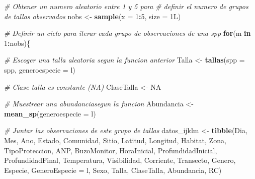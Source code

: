 \documentclass[]{krantz}
\makeatletter
\newenvironment{Shaded}{\begin{snugshade}}{\end{snugshade}}
\newcommand{\CommentTok}[1]{\textcolor[rgb]{0.56,0.35,0.01}{\textit{#1}}}
\newcommand{\ControlFlowTok}[1]{\textcolor[rgb]{0.13,0.29,0.53}{\textbf{#1}}}
\newcommand{\DataTypeTok}[1]{\textcolor[rgb]{0.13,0.29,0.53}{#1}}
\newcommand{\DecValTok}[1]{\textcolor[rgb]{0.00,0.00,0.81}{#1}}
\newcommand{\KeywordTok}[1]{\textcolor[rgb]{0.13,0.29,0.53}{\textbf{#1}}}
\newcommand{\NormalTok}[1]{#1}
\newcommand{\OperatorTok}[1]{\textcolor[rgb]{0.81,0.36,0.00}{\textbf{#1}}}
\newcommand{\OtherTok}[1]{\textcolor[rgb]{0.56,0.35,0.01}{#1}}
\newcommand{\StringTok}[1]{\textcolor[rgb]{0.31,0.60,0.02}{#1}}
\newenvironment{kframe}{%
\medskip{}
\setlength{\fboxsep}{.8em}
 \def\at@end@of@kframe{}%
 \ifinner\ifhmode%
  \def\at@end@of@kframe{\end{minipage}}%
  \begin{minipage}{\columnwidth}%
 \fi\fi%
 \def\FrameCommand##1{\hskip\@totalleftmargin \hskip-\fboxsep
 \colorbox{shadecolor}{##1}\hskip-\fboxsep
     \hskip-\linewidth \hskip-\@totalleftmargin \hskip\columnwidth}%
 \MakeFramed {\advance\hsize-\width
   \@totalleftmargin\z@ \linewidth\hsize
   \@setminipage}}%
 {\par\unskip\endMakeFramed%
 \at@end@of@kframe}
\renewenvironment{Shaded}{\begin{kframe}}{\end{kframe}}
\makeatother
\begin{document}
\begin{Shaded}
\begin{Highlighting}[]
{        \CommentTok{# Obtener un numero aleatorio entre 1 y 5 para}
        \CommentTok{# definir el numero de grupos de tallas observados}
\NormalTok{        nobs <-}\StringTok{ }\KeywordTok{sample}\NormalTok{(}\DataTypeTok{x =} \DecValTok{1}\OperatorTok{:}\DecValTok{5}\NormalTok{, }\DataTypeTok{size =}\NormalTok{ 1L)}
        
        \CommentTok{# Definir un ciclo para iterar cada grupo de observaciones de una spp}
        \ControlFlowTok{for}\NormalTok{(m }\ControlFlowTok{in} \DecValTok{1}\OperatorTok{:}\NormalTok{nobs)\{}
          
          \CommentTok{# Escoger una talla aleatoria segun la funcion anterior}
\NormalTok{          Talla <-}\StringTok{ }\KeywordTok{tallas}\NormalTok{(}\DataTypeTok{spp =}\NormalTok{ spp, }\DataTypeTok{generoespecie =}\NormalTok{ l)}
          
          \CommentTok{# Clase talla es constante (NA)}
\NormalTok{          ClaseTalla <-}\StringTok{ }\OtherTok{NA}
          
          \CommentTok{# Muestrear una abundanciasegun la funcion}
\NormalTok{          Abundancia <-}\StringTok{ }\KeywordTok{mean_sp}\NormalTok{(}\DataTypeTok{generoespecie =}\NormalTok{ l)}
          
          \CommentTok{# Juntar las observaciones de este grupo de tallas}
\NormalTok{          datos_ijklm <-}\StringTok{ }\KeywordTok{tibble}\NormalTok{(Dia,}
\NormalTok{                                Mes,}
\NormalTok{                                Ano,}
\NormalTok{                                Estado,}
\NormalTok{                                Comunidad,}
\NormalTok{                                Sitio,}
\NormalTok{                                Latitud,}
\NormalTok{                                Longitud,}
\NormalTok{                                Habitat,}
\NormalTok{                                Zona,}
\NormalTok{                                TipoProteccion,}
\NormalTok{                                ANP,}
\NormalTok{                                BuzoMonitor, }
\NormalTok{                                HoraInicial,}
\NormalTok{                                ProfundidadInicial,}
\NormalTok{                                ProfundidadFinal,}
\NormalTok{                                Temperatura,}
\NormalTok{                                Visibilidad,}
\NormalTok{                                Corriente,}
\NormalTok{                                Transecto,}
\NormalTok{                                Genero,}
\NormalTok{                                Especie,}
                                \DataTypeTok{GeneroEspecie =}\NormalTok{ l,}
\NormalTok{                                Sexo,}
\NormalTok{                                Talla,}
\NormalTok{                                ClaseTalla,}
\NormalTok{                                Abundancia,}
\NormalTok{                                RC)}
          
}
\end{Highlighting}
\end{Shaded}
\end{document}
